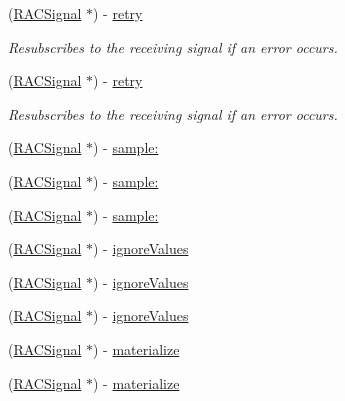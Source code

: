 \begin{DoxyCompactItemize}
(\mbox{\hyperlink{interface_r_a_c_signal}{R\+A\+C\+Signal}} $\ast$) -\/ \mbox{\hyperlink{interface_r_a_c_signal_a4fb19910fa59ca689d5f63bbd880e1e8}{retry}}
\begin{DoxyCompactList}\small\item\em Resubscribes to the receiving signal if an error occurs. \end{DoxyCompactList}\item 
\mbox{\label{interface_r_a_c_signal_a4fb19910fa59ca689d5f63bbd880e1e8}} 
(\mbox{\hyperlink{interface_r_a_c_signal}{R\+A\+C\+Signal}} $\ast$) -\/ \mbox{\hyperlink{interface_r_a_c_signal_a4fb19910fa59ca689d5f63bbd880e1e8}{retry}}
\begin{DoxyCompactList}\small\item\em Resubscribes to the receiving signal if an error occurs. \end{DoxyCompactList}\item 
(\mbox{\hyperlink{interface_r_a_c_signal}{R\+A\+C\+Signal}} $\ast$) -\/ \mbox{\hyperlink{interface_r_a_c_signal_a556702f113ba65f01fabf8363bd25e46}{sample\+:}}
\item 
(\mbox{\hyperlink{interface_r_a_c_signal}{R\+A\+C\+Signal}} $\ast$) -\/ \mbox{\hyperlink{interface_r_a_c_signal_a556702f113ba65f01fabf8363bd25e46}{sample\+:}}
\item 
(\mbox{\hyperlink{interface_r_a_c_signal}{R\+A\+C\+Signal}} $\ast$) -\/ \mbox{\hyperlink{interface_r_a_c_signal_a556702f113ba65f01fabf8363bd25e46}{sample\+:}}
\item 
(\mbox{\hyperlink{interface_r_a_c_signal}{R\+A\+C\+Signal}} $\ast$) -\/ \mbox{\hyperlink{interface_r_a_c_signal_a2997862d443d16efa3197facb6a354d1}{ignore\+Values}}
\item 
(\mbox{\hyperlink{interface_r_a_c_signal}{R\+A\+C\+Signal}} $\ast$) -\/ \mbox{\hyperlink{interface_r_a_c_signal_a2997862d443d16efa3197facb6a354d1}{ignore\+Values}}
\item 
(\mbox{\hyperlink{interface_r_a_c_signal}{R\+A\+C\+Signal}} $\ast$) -\/ \mbox{\hyperlink{interface_r_a_c_signal_a2997862d443d16efa3197facb6a354d1}{ignore\+Values}}
\item 
(\mbox{\hyperlink{interface_r_a_c_signal}{R\+A\+C\+Signal}} $\ast$) -\/ \mbox{\hyperlink{interface_r_a_c_signal_a2b970ec1845b139478ba31f00fe34b71}{materialize}}
\item 
(\mbox{\hyperlink{interface_r_a_c_signal}{R\+A\+C\+Signal}} $\ast$) -\/ \mbox{\hyperlink{interface_r_a_c_signal_a2b970ec1845b139478ba31f00fe34b71}{materialize}}

\end{DoxyCompactItemize}
